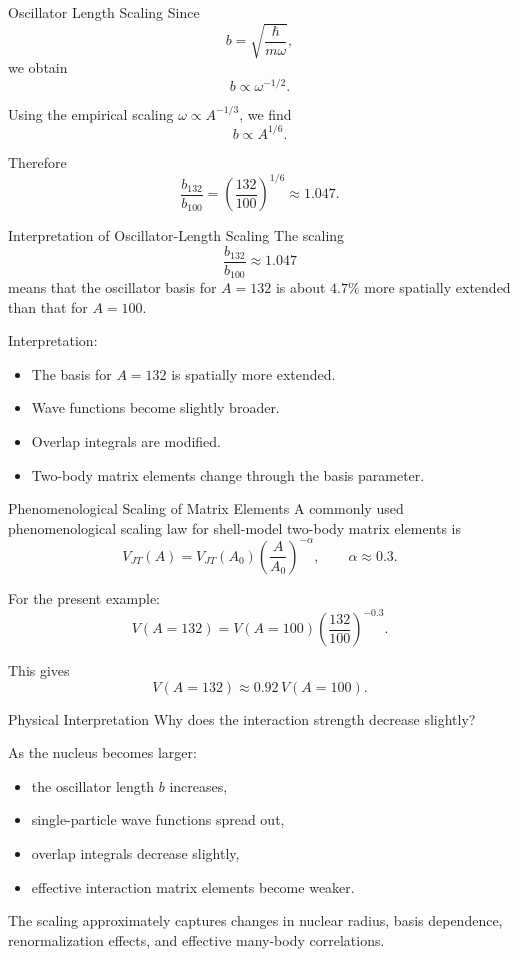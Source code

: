 \documentclass[10pt]{beamer}
\begin{document}
\begin{frame}[t]{Oscillator Length Scaling}
\small
Since
\[
b=\sqrt{\frac{\hbar}{m\omega}},
\]
we obtain
\[
b\propto \omega^{-1/2} .
\]

Using the empirical scaling \(\omega\propto A^{-1/3}\), we find
\[
b\propto A^{1/6} .
\]

Therefore
\[
\frac{b_{132}}{b_{100}}
=\left(\frac{132}{100}\right)^{1/6}
\approx 1.047 .
\]
\end{frame}

\begin{frame}[t]{Interpretation of Oscillator-Length Scaling}
\small
The scaling
\[
\frac{b_{132}}{b_{100}}\approx 1.047
\]
means that the oscillator basis for \(A=132\) is about \(4.7\%\) more
spatially extended than that for \(A=100\).

\medskip

Interpretation:
\begin{itemize}
    \item The basis for \(A=132\) is spatially more extended.
    \item Wave functions become slightly broader.
    \item Overlap integrals are modified.
    \item Two-body matrix elements change through the basis parameter.
\end{itemize}
\end{frame}

\begin{frame}[t]{Phenomenological Scaling of Matrix Elements}
\small
A commonly used phenomenological scaling law for shell-model two-body
matrix elements is
\[
V_{JT}(A)=V_{JT}(A_0)\left(\frac{A}{A_0}\right)^{-\alpha},
\qquad \alpha\approx 0.3 .
\]

For the present example:
\[
V(A=132)=V(A=100)\left(\frac{132}{100}\right)^{-0.3} .
\]

This gives
\[
V(A=132)\approx 0.92\,V(A=100) .
\]
\end{frame}

\begin{frame}[t]{Physical Interpretation}
\small
Why does the interaction strength decrease slightly?

\medskip

As the nucleus becomes larger:
\begin{itemize}
    \item the oscillator length \(b\) increases,
    \item single-particle wave functions spread out,
    \item overlap integrals decrease slightly,
    \item effective interaction matrix elements become weaker.
\end{itemize}

\medskip

The scaling approximately captures changes in nuclear radius, basis
dependence, renormalization effects, and effective many-body correlations.
\end{frame}
\end{document}
